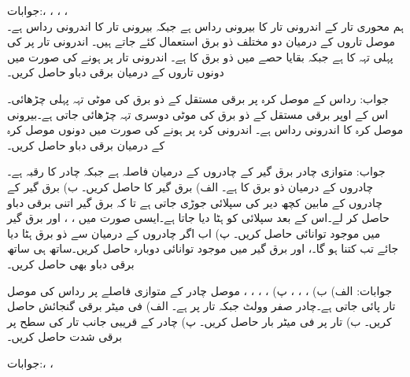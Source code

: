 جوابات:، ، ، ، \\
ہم محوری تار کے اندرونی تار کا بیرونی رداس  ہے جبکہ بیرونی تار کا اندرونی رداس  ہے۔موصل تاروں کے درمیان دو مختلف ذو برق استعمال کئے جاتے ہیں۔ اندرونی تار پر  کی پہلی تہہ کا  ہے جبکہ بقایا حصے میں ذو برق کا  ہے۔ اندرونی تار پر  ہونے کی صورت میں دونوں تاروں کے درمیان برقی دباو حاصل کریں۔

جواب:
رداس  کے موصل کرہ پر  برقی مستقل کے ذو برق کی  موٹی تہہ پہلی چڑھائی۔اس کے اوپر  برقی مستقل کے ذو برق کی  موٹی دوسری تہہ چڑھائی جاتی ہے۔بیرونی موصل کرہ کا اندرونی رداس  ہے۔ اندرونی کرہ پر  ہونے کی صورت میں دونوں موصل کرہ کے درمیان برقی دباو حاصل کریں۔

جواب:
متوازی چادر برق گیر کے چادروں کے درمیان فاصلہ  ہے جبکہ چادر کا رقبہ  ہے۔چادروں کے درمیان ذو برق کا  ہے۔ الف) برق گیر کا  حاصل کریں۔ ب) برق گیر کے چادروں کے مابین کچھ دیر  کی سپلائی جوڑی جاتی ہے تا کہ برق گیر اتنی  برقی دباو حاصل کر لے۔اس کے بعد سپلائی کو ہٹا دیا جاتا ہے۔ایسی صورت میں ، ،  اور برق گیر میں موجود توانائی  حاصل کریں۔ پ) اب اگر چادروں کے درمیان سے ذو برق ہٹا دیا جائے تب  کتنا ہو گا۔،  اور برق گیر میں موجود توانائی  دوبارہ حاصل کریں۔ساتھ ہی ساتھ برقی دباو بھی حاصل کریں۔ 

جوابات: الف)  ب) ، ، ،  پ) ، ، ، ، 
موصل چادر کے متوازی  فاصلے پر  رداس کی موصل تار پائی جاتی ہے۔چادر صفر وولٹ جبکہ تار  پر ہے۔ الف) فی میٹر برقی گنجائش حاصل کریں۔ ب) تار پر فی میٹر بار حاصل کریں۔ پ) چادر کے قریبی جانب تار کی سطح پر برقی شدت حاصل کریں۔

جوابات:، ، 

